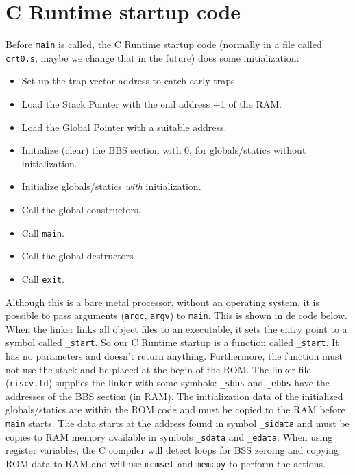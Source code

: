 \documentclass[12pt]{article}
\begin{document}
\appendix
\section{C Runtime startup code}
Before \lstinline|main| is called, the C Runtime startup code (normally in a file called \lstinline|crt0.s|, maybe we change that in the future) does some initialization:

\begin{itemize}
\item Set up the trap vector address to catch early traps.
\item Load the Stack Pointer with the end address +1 of the RAM.
\item Load the Global Pointer with a suitable address.
\item Initialize (clear) the BBS section with 0, for globals/statics without initialization.
\item Initialize globals/statics \emph{with} initialization.
\item Call the global constructors.
\item Call \lstinline|main|.
\item Call the global destructors.
\item Call \lstinline|exit|.
\end{itemize} 

Although this is a bare metal processor, without an operating system, it is possible to pass arguments (\lstinline|argc|, \lstinline|argv|) to \lstinline|main|. This is shown in de code below. When the linker links all object files to an executable, it sets the entry point to a symbol called \lstinline|_start|. So our C Runtime startup is a function called \lstinline|_start|. It has no parameters and doesn't return anything. Furthermore, the function must not use the stack and be placed at the begin of the ROM. The linker file (\lstinline|riscv.ld|) supplies the linker with some symbols: \lstinline|_sbbs| and \lstinline|_ebbs| have the addresses of the BBS section (in RAM). The initialization data of the initialized globals/statics are within the ROM code and must be copied to the RAM before \lstinline|main| starts. The data starts at the address found in symbol \lstinline|_sidata| and must be copies to RAM memory available in symbols \lstinline|_sdata| and \lstinline|_edata|.
When using register variables, the C compiler will detect loops for BSS zeroing and copying ROM data to RAM and will use \lstinline|memset| and \lstinline|memcpy| to perform the actions.
\end{document}

